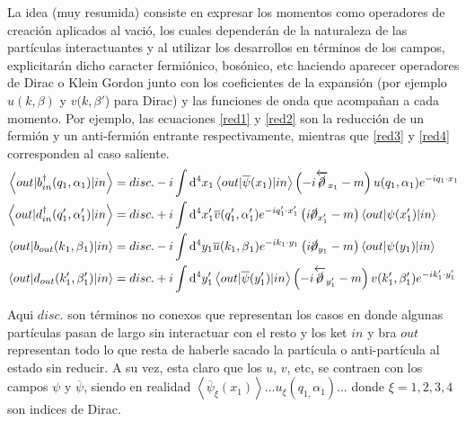 \documentclass{article}
\numberwithin{equation}{section}
\begin{document}
La idea (muy resumida) consiste en expresar los momentos como operadores
de creación aplicados al vació, los cuales dependerán de la naturaleza
de las partículas interactuantes y al utilizar los desarrollos en términos de
los campos, explicitarán dicho caracter fermiónico, bosónico, etc
haciendo aparecer operadores de Dirac o Klein Gordon junto con los
coeficientes de la expansión (por ejemplo $u(k,\beta)$ y $v(k,\beta'$)
para Dirac) y las funciones de onda que acompañan a cada momento.
Por ejemplo, las ecuaciones \ref{red1} y \ref{red2}  son la reducción de un fermión
y un anti-fermión entrante respectivamente, mientras que \ref{red3}  y \ref{red4}  corresponden
al caso saliente.
\begin{subequations}\label{red}
	\begin{align}
	\left\langle out|b_{in}^{\dagger}(q_{1},\alpha_{1})|in\right\rangle  & =disc.-i\int \mathrm{d^4}x_{1}\left\langle out|\overline{\psi}(x_{1})|in\right\rangle \left(-i\overleftarrow{\cancel{\partial}}_{x_{1}}-m\right)u(q_{1},\alpha_{1})e^{-iq_{1}\cdot x_{1}} \label{red1}\\
	\left\langle out|d_{in}^{\dagger}(q'_{1},\alpha'_{1})|in\right\rangle  & =disc.+i\int \mathrm{d^4}x'_{1}\overline{v}(q'_{1},\alpha'_{1})e^{-iq'_{1}\cdot x'_{1}}\left(i\cancel{\partial}_{x'_{1}}-m\right)\left\langle out|\psi(x'_{1})|in\right\rangle \label{red2} \\
	\left\langle out|b_{out}(k{}_{1},\beta{}_{1})|in\right\rangle  & =disc.-i\int \mathrm{d^4}y_{1}\overline{u}(k_{1},\beta{}_{1})e^{-ik_{1}\cdot y_{1}}\left(i\cancel{\partial}_{y_{1}}-m\right)\left\langle out|\psi(y_{1})|in\right\rangle \label{red3} \\
	\left\langle out|d_{out}(k'_{1},\beta'_{1})|in\right\rangle  & =disc.+i\int \mathrm{d^4}y'_{1}\left\langle out|\overline{\psi}(y'_{1})|in\right\rangle \left(-i\overleftarrow{\cancel{\partial}}_{y'_{1}}-m\right)v(k'_{1},\beta'_{1})e^{-ik'_{1}\cdot y'_{1}} \label{red4}
	\end{align}
\end{subequations}

Aqui $disc.$ son términos no conexos que representan los casos en
donde algunas partículas pasan de largo sin interactuar con el resto
y los ket $ in $ y bra $ out $ representan todo lo que resta de haberle sacado
la partícula o anti-partícula al estado sin reducir. A su vez, esta
claro que los $ u $, $ v $, etc, se contraen con los campos $\psi$ y $\overline{\psi}$,
siendo en realidad $\left\langle \overline{\psi}_{\xi}(x_{1})\right\rangle ...u_{\xi}(q_{1,}\alpha_{1})$...
donde $\xi=1,2,3,4$ son indices de Dirac.
\end{document}
